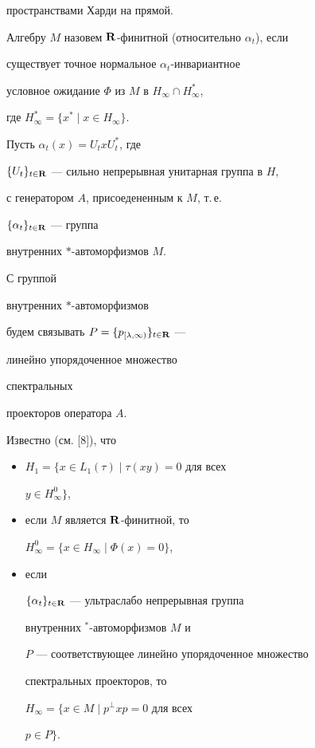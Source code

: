 пространствами Харди на прямой.


Алгебру $M$ назовем $\bold R$-финитной (относительно $\alpha_{t}$), если


существует точное нормальное $\alpha_{t}$-инвариантное


условное ожидание $\Phi$ из $M$ в $H_{\infty} \cap H_{\infty}^{*}$,


где $H_{\infty}^{*}=\{x^{*}\mid x\in H_{\infty}\}$.


Пусть $\alpha_{t}(x)=U_{t}xU_{t}^{*}$, где


$\{U_{t}\}_{t\in {\bold R}}$ --- сильно непрерывная унитарная группа в $H$,


с генератором $A$, присоедененным к $M$, т.\,е.


$\{\alpha_{t}\}_{t\in {\bf R}}$ --- группа


внутренних $*$-автоморфизмов $M$.


С группой


внутренних $*$-автоморфизмов


будем связывать $P=\{ p_{[\lambda,\infty)}\}_{t\in {\bold R}}$ ---


линейно упорядоченное множество


спектральных


проекторов оператора $A$.


Известно (см. [8]), что


\begin{itemize}


\item[1)] $H_{1}= \{ x\in L_{1}(\tau)\mid\tau (xy)=0$ для всех


$y\in {H_{\infty}^{0}} \}$,


\item[2)] если $M$ является $\bold R$-финитной, то


$H_{\infty}^{0}= \{ x\in H_{\infty} \mid \Phi (x)=0 \}$,


\item[3)] если


$\{\alpha_{t}\}_{t\in {\bold R}}$ --- ультраслабо непрерывная группа 


внутренних $^{*}$-автоморфизмов $M$ и


$P$ --- соответствующее линейно упорядоченное множество


спектральных проекторов, то


$H_{\infty}= \{ x\in M\mid p^{\perp}xp=0$ для всех


$p\in P \}$.


\end{itemize}





